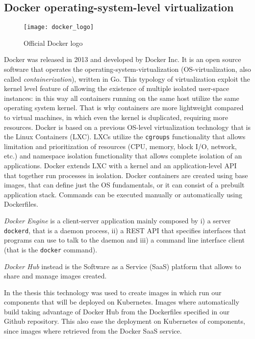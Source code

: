 \subsection{Docker operating-system-level virtualization}
\begin{figure}[t]
  \centering \texttt{[image: docker\_logo]}
  \caption{Official Docker logo}
  \label{chap:intro:img:docker_logo}
\end{figure}
Docker was released in 2013 and developed by Docker Inc. It is an open source
software that operates the operating-system-virtualization (OS-virtualization,
also called \emph{containerization}), written in Go. This typology of
virtualization exploit the kernel level feature of allowing the existence of
multiple isolated user-space instances: in this way all containers running on
the same host utilize the same operating system kernel. That is why containers
are more lightweight compared to virtual machines, in which even the kernel is
duplicated, requiring more resources. Docker is based on a previous OS-level
virtualization technology that is the Linux Containers (LXC). LXCs utilize the 
\texttt{cgroups} functionality that allows limitation and prioritization of
resources (CPU, memory, block I/O, network, etc.) and namespace isolation
functionality that allows complete isolation of an applications. Docker extends
LXC with a kernel and an application-level API that together run processes in
isolation. Docker containers are created using base images, that can define just
the OS fundamentals, or it can consist of a prebuilt application stack.
Commands can be executed manually or automatically using Dockerfiles.

\emph{Docker Engine} is a client-server application mainly composed by i) a
server \texttt{dockerd}, that is a daemon process, ii) a REST API that specifies
interfaces that programs can use to talk to the daemon and iii) a command line
interface client (that is the \texttt{docker} command).

\emph{Docker Hub} instead is the Software as a Service (SaaS) platform that
allows to share and manage images created.

In the thesis this technology was used to create images in which run our
components that will be deployed on Kubernetes. Images where automatically build
taking advantage of Docker Hub from the Dockerfiles specified in our Github
repository. This also ease the deployment on Kubernetes of components, since
images where retrieved from the Docker SaaS service.

